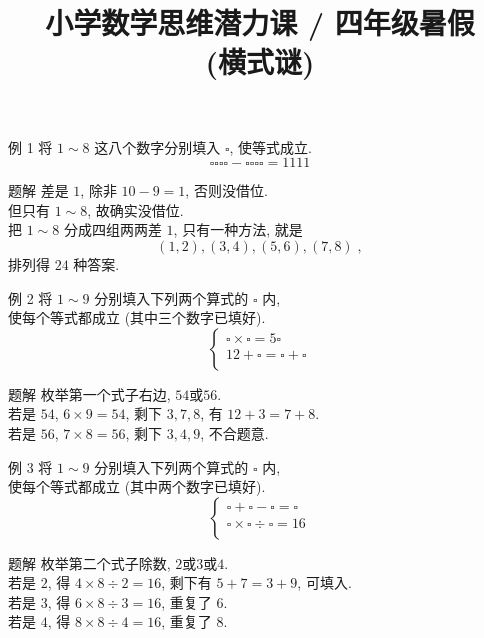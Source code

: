\documentclass[content.tex]{subfiles}
\title{小学数学思维潜力课 / 四年级暑假 \\ (横式谜)}
\begin{document}
\begin{frame}
\maketitle
\end{frame}

\begin{frame}{例 1}
将 $1 \sim 8$ 这八个数字分别填入 $\square$, 使等式成立.
$$
\square\square\square\square -
\square\square\square\square = 1111
$$
\begin{exampleblock}{题解}
差是 $1$, 除非 $10-9=1$, 否则没借位. \\
但只有 $1 \sim 8$, 故确实没借位. \\
把 $1 \sim 8$ 分成四组两两差 $1$, 只有一种方法, 就是
$$(1,2),(3,4),(5,6),(7,8)\;,$$
排列得 $24$ 种答案.
\end{exampleblock}
\end{frame}

\begin{frame}{例 2}
将 $1 \sim 9$ 分别填入下列两个算式的 $\square$ 内, \\
使每个等式都成立 (其中三个数字已填好).
$$
\begin{cases}
\square \times \square = 5\square \\
12 + \square = \square + \square \\
\end{cases}
$$
\begin{exampleblock}{题解}
枚举第一个式子右边, $54\text{或}56$. \\
若是 $54$, $6 \times 9 = 54$, 剩下 $3, 7, 8$, 有 $12+3=7+8$. \\
若是 $56$, $7 \times 8 = 56$, 剩下 $3, 4, 9$, 不合题意.
\end{exampleblock}
\end{frame}

\begin{frame}{例 3}
将 $1 \sim 9$ 分别填入下列两个算式的 $\square$ 内, \\
使每个等式都成立 (其中两个数字已填好).
$$
\begin{cases}
\square + \square - \square  = \square \\
\square \times \square \div \square = 16 \\
\end{cases}
$$
\begin{exampleblock}{题解}
枚举第二个式子除数, $2\text{或}3\text{或}4$. \\
若是 $2$, 得 $4 \times 8 \div 2 = 16$, 剩下有 $5+7=3+9$, 可填入. \\
若是 $3$, 得 $6 \times 8 \div 3 = 16$, 重复了 $6$. \\
若是 $4$, 得 $8 \times 8 \div 4 = 16$, 重复了 $8$. \\
\end{exampleblock}
\end{frame}
\end{document}
